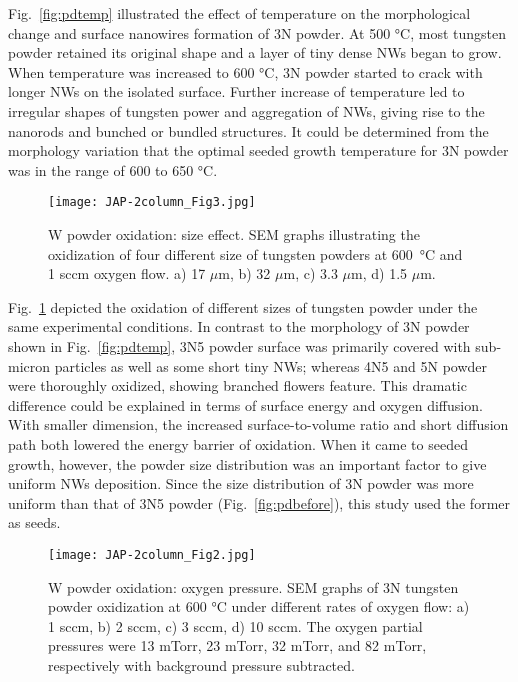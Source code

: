 Fig.~\ref{fig:pdtemp} illustrated the effect of temperature on the morphological change and surface nanowires formation of 3N powder. At 500 \si{\degreeCelsius}, most tungsten powder retained its original shape and a layer of tiny dense NWs began to grow. When temperature was increased to 600 \si{\degreeCelsius}, 3N powder started to crack with longer NWs on the isolated surface. Further increase of temperature led to irregular shapes of tungsten power and aggregation of NWs, giving rise to the nanorods and bunched or bundled structures. It could be determined from the morphology variation that the optimal seeded growth temperature for 3N powder was in the range of 600 to 650 \si{\degreeCelsius}.
\begin{figure}[htb]
\centering
\texttt{[image: JAP-2column\_Fig3.jpg]}
\caption[W powder oxidation: size effect]{W powder oxidation: size effect. SEM graphs illustrating the oxidization of four different size of tungsten powders at 600~\si{\degreeCelsius} and 1 sccm oxygen flow. a) 17 $\mu$m, b) 32 $\mu$m, c) 3.3 $\mu$m, d) 1.5 $\mu$m.}
\label{fig:pdsize}
\end{figure}

Fig.~\ref{fig:pdsize} depicted the oxidation of different sizes of tungsten powder under the same experimental conditions. In contrast to the morphology of 3N powder shown in Fig.~\ref{fig:pdtemp}, 3N5 powder surface was primarily covered with sub-micron particles as well as some short tiny NWs; whereas 4N5 and 5N powder were thoroughly oxidized, showing branched flowers feature. This dramatic difference could be explained in terms of surface energy and oxygen diffusion. With smaller dimension, the increased surface-to-volume ratio and short diffusion path both lowered the energy barrier of oxidation.\cite{tungsten1999} When it came to seeded growth, however, the powder size distribution was an important factor to give uniform NWs deposition. Since the size distribution of 3N powder was more uniform than that of 3N5 powder (Fig.~\ref{fig:pdbefore}), this study used the former as seeds.
\begin{figure}[htb]
\centering
\texttt{[image: JAP-2column\_Fig2.jpg]}
\caption[W powder oxidation: oxygen pressure]{W powder oxidation: oxygen pressure. SEM graphs of 3N tungsten powder oxidization at 600 \si{\degreeCelsius} under different rates of oxygen flow: a) 1 sccm, b) 2 sccm, c) 3 sccm, d) 10 sccm. The oxygen partial pressures were 13 mTorr, 23 mTorr, 32 mTorr, and 82 mTorr, respectively with background pressure subtracted.}
\label{fig:pdoxy}
\end{figure}


